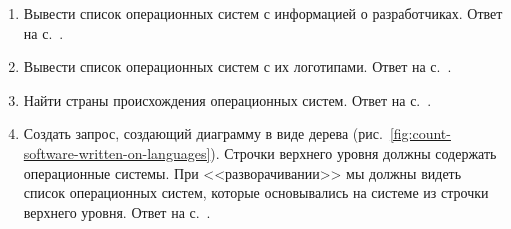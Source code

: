 \begin{enumerate}
	\item Вывести список операционных систем с информацией о разработчиках. Ответ на с.~\pageref{answer:os_and_developers}.
	\item Вывести список операционных систем с их логотипами. Ответ на с.~\pageref{answer:os_and_logos}.
	\item Найти страны происхождения операционных систем. Ответ на с.~\pageref{answer:os_country}.
    \item Создать запрос, создающий диаграмму в виде дерева (рис.~\ref{fig:count-software-written-on-languages}). 
        Строчки верхнего уровня должны содержать операционные системы. 
        При <<разворачивании>> мы должны видеть список операционных систем, 
        которые основывались на системе из строчки верхнего уровня. 
        Ответ на с.~\pageref{answer:os_and_bases}.
\end{enumerate}
